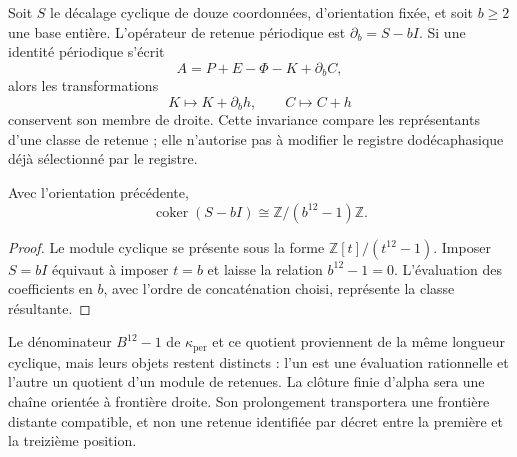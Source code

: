 Soit \(S\) le décalage cyclique de douze coordonnées, d'orientation fixée, et soit \(b\geq2\) une base entière. L'opérateur de retenue périodique est \(\partial_b=S-bI\). Si une identité périodique s'écrit
\[
 A=P+E-\Phi-K+\partial_bC,
\]
alors les transformations
\[
 K\longmapsto K+\partial_bh,\qquad C\longmapsto C+h
\]
conservent son membre de droite. Cette invariance compare les représentants d'une
classe de retenue ; elle n'autorise pas à modifier le registre dodécaphasique déjà
sélectionné par le registre.

\begin{proposition}
\label{prop:k-cociente-acarreo}
Avec l'orientation précédente,
\[
 \operatorname{coker}(S-bI)\cong\mathbb Z/(b^{12}-1)\mathbb Z.
\]
\end{proposition}

\begin{proof}
Le module cyclique se présente sous la forme
\(\mathbb Z[t]/(t^{12}-1)\). Imposer \(S=bI\) équivaut à imposer
\(t=b\) et laisse la relation \(b^{12}-1=0\). L'évaluation des
coefficients en \(b\), avec l'ordre de concaténation choisi, représente
la classe résultante.
\end{proof}

Le dénominateur \(B^{12}-1\) de \(\kappa_{\mathrm{per}}\) et ce quotient proviennent de la même longueur cyclique, mais leurs objets restent distincts : l'un est une évaluation rationnelle et l'autre un quotient d'un module de retenues. La clôture finie d'alpha sera une chaîne orientée à frontière droite. Son prolongement transportera une frontière distante compatible, et non une retenue identifiée par décret entre la première et la treizième position.
